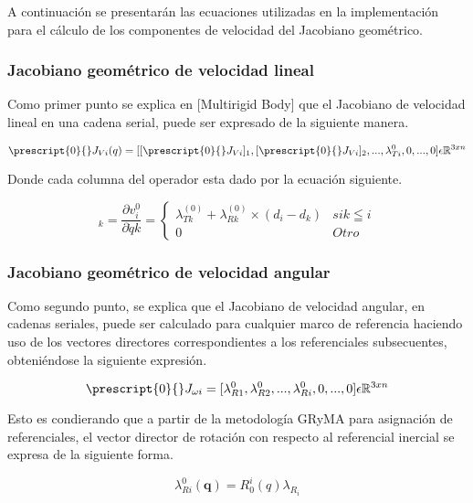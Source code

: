        A continuación se presentarán las ecuaciones utilizadas en la implementación para el 
        cálculo de los componentes de velocidad del Jacobiano geométrico.

    \subsubsection{Jacobiano geométrico de velocidad lineal}
        Como primer punto se explica en [Multirigid Body] que el Jacobiano de velocidad lineal 
        en una cadena serial, puede ser expresado de la siguiente manera.

        \begin{equation}
            \prescript{0}{}J_{Vi}(q) = 
            [[\prescript{0}{}J_{Vi}]_1, [\prescript{0}{}J_{Vi}]_2, ..., \lambda^{0}_{Ti}, 0, ..., 0]
            \epsilon \mathbb{R}^{3xn}
            \label{eq:Jv}
        \end{equation}

        Donde cada columna del operador esta dado por la ecuación siguiente.

        \begin{equation*}
            [\prescript{0}{}J_{Vi}]_k = \frac{\partial v^{0}_i}{\partial \dot{q}k} = 
            \begin{cases}
                \lambda^{(0)}_{Tk} + \lambda^{(0)}_{Rk} \times (d_i - d_k) & si k \leqq i \\
                0                                                          & Otro
            \end{cases}
        \end{equation*}

    \subsubsection{Jacobiano geométrico de velocidad angular}
        Como segundo punto, se explica que el Jacobiano de velocidad angular, 
        en cadenas seriales, puede ser calculado para cualquier marco de referencia 
        haciendo uso de los vectores directores correspondientes a los referenciales 
        subsecuentes, obteniéndose la siguiente expresión.

        \begin{equation}
            \prescript{0}{}J_{\omega i} =
            [\lambda^{0}_{R1}, \lambda^{0}_{R2}, ..., \lambda^{0}_{Ri}, 0, ..., 0]
            \epsilon \mathbb{R}^{3xn}
            \label{eq:Jw}
        \end{equation}

        Esto es condierando que a partir de la metodología GRyMA para asignación de referenciales, 
        el vector director de rotación con respecto al referencial inercial se expresa de la siguiente 
        forma.

        \begin{equation*}
            \lambda^{0}_{Ri}(\textbf{q}) = R^i_0(q)\lambda_{R_i}
        \end{equation*}